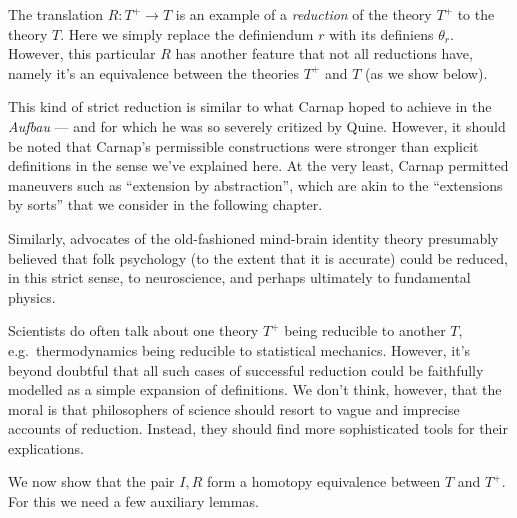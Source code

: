 \begin{disc} The translation $R:T^+\to T$ is an example of a
  \emph{reduction} of the theory $T^+$ to the theory $T$.  Here we
  simply replace the definiendum $r$ with its definiens $\theta _r$.
  However, this particular $R$ has another feature that not all
  reductions have, namely it's an equivalence between the theories
  $T^+$ and $T$ (as we show below).

  This kind of strict reduction is similar to what Carnap hoped to
  achieve in the {\it Aufbau} --- and for which he was so severely
  critized by Quine.  However, it should be noted that Carnap's
  permissible constructions were stronger than explicit definitions in
  the sense we've explained here.  At the very least, Carnap permitted
  maneuvers such as ``extension by abstraction'', which are akin to
  the ``extensions by sorts'' that we consider in the following
  chapter.

  Similarly, advocates of the old-fashioned mind-brain identity theory
  presumably believed that folk psychology (to the extent that it is
  accurate) could be reduced, in this strict sense, to neuroscience,
  and perhaps ultimately to fundamental physics.

  Scientists do often talk about one theory $T^+$ being reducible to
  another $T$, e.g.\ thermodynamics being reducible to statistical
  mechanics.  However, it's beyond doubtful that all such cases of
  successful reduction could be faithfully modelled as a simple
  expansion of definitions.  We don't think, however, that the moral
  is that philosophers of science should resort to vague and imprecise
  accounts of reduction.  Instead, they should find more sophisticated
  tools for their explications.
\end{disc}

We now show that the pair $I,R$ form a homotopy equivalence between
$T$ and $T^+$.  For this we need a few auxiliary lemmas.


